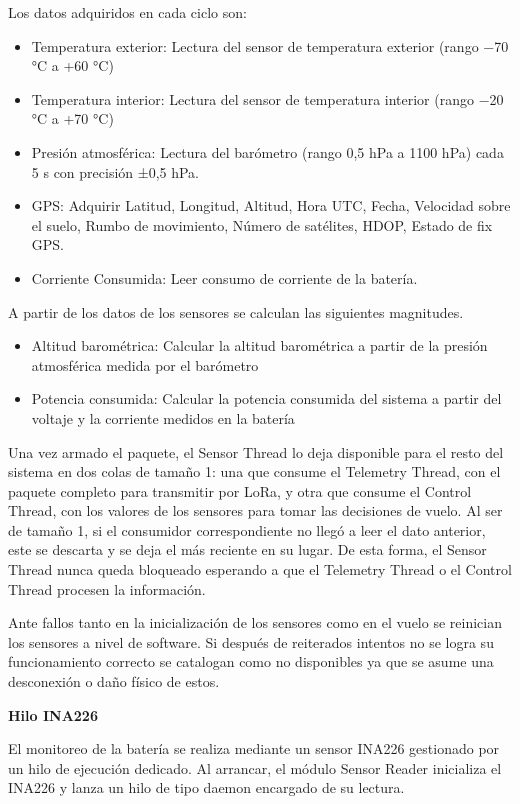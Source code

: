 \documentclass[12pt,a4paper]{article}
\begin{document}
Los datos adquiridos en cada ciclo son:

\begin{itemize}
\item
  Temperatura exterior: Lectura del sensor de temperatura exterior (rango −70 °C a +60 °C)
\item
  Temperatura interior: Lectura del sensor de temperatura interior (rango −20 °C a +70 °C)
\item
  Presión atmosférica: Lectura del barómetro (rango 0,5 hPa a 1100 hPa) cada 5 s con precisión ±0,5 hPa.
\item
  GPS: Adquirir Latitud, Longitud, Altitud, Hora UTC, Fecha, Velocidad sobre el suelo, Rumbo de movimiento, Número de satélites, HDOP, Estado de fix GPS.
\item
  Corriente Consumida: Leer consumo de corriente de la batería.
\end{itemize}

A partir de los datos de los sensores se calculan las siguientes magnitudes.

\begin{itemize}
\item
  Altitud barométrica: Calcular la altitud barométrica a partir de la presión atmosférica medida por el barómetro
\item
  Potencia consumida: Calcular la potencia consumida del sistema a partir del voltaje y la corriente medidos en la batería
\end{itemize}

Una vez armado el paquete, el Sensor Thread lo deja disponible para el resto del sistema en dos colas de tamaño 1: una que consume el Telemetry Thread, con el paquete completo para transmitir por LoRa, y otra que consume el Control Thread, con los valores de los sensores para tomar las decisiones de vuelo. Al ser de tamaño 1, si el consumidor correspondiente no llegó a leer el dato anterior, este se descarta y se deja el más reciente en su lugar. De esta forma, el Sensor Thread nunca queda bloqueado esperando a que el Telemetry Thread o el Control Thread procesen la información.

Ante fallos tanto en la inicialización de los sensores como en el vuelo se reinician los sensores a nivel de software. Si después de reiterados intentos no se logra su funcionamiento correcto se catalogan como no disponibles ya que se asume una desconexión o daño físico de estos.

\textbf{Hilo INA226}

El monitoreo de la batería se realiza mediante un sensor INA226 gestionado por un hilo de ejecución dedicado. Al arrancar, el módulo Sensor Reader inicializa el INA226 y lanza un hilo de tipo daemon encargado de su lectura.
\end{document}
